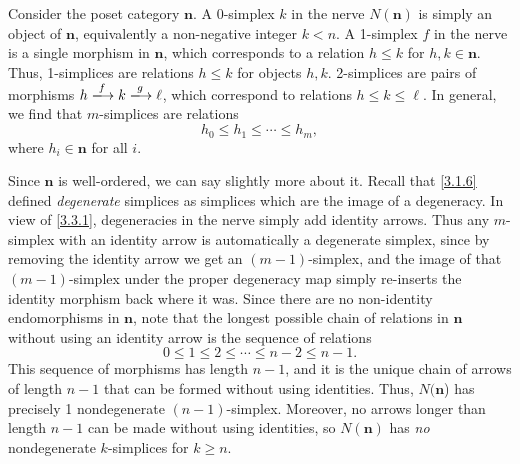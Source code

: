 \begin{example}\label{3.3.2}
    Consider the poset category $\mathbf{n}$. A 0-simplex $k$ in the nerve $N(\mathbf{n})$ is simply an object of $\mathbf{n}$, equivalently a non-negative integer $k<n$. A 1-simplex $f$ in the nerve is a single morphism in $\mathbf{n}$, which corresponds to a relation $h\leq k$ for $h,k\in\mathbf{n}$. Thus, 1-simplices are relations $h\leq k$ for objects $h,k$. 2-simplices are pairs of morphisms $h\xlongrightarrow{f}k\xlongrightarrow{g}\ell$, which correspond to relations $h\leq k\leq \ell$. In general, we find that $m$-simplices are relations
    \[
    h_0\leq h_1\leq\cdots\leq h_m,
    \]
    where $h_i\in\mathbf{n}$ for all $i$.

    Since $\mathbf{n}$ is well-ordered, we can say slightly more about it. Recall that \cref{3.1.6} defined \emph{degenerate} simplices as simplices which are the image of a degeneracy. In view of \cref{3.3.1}, degeneracies in the nerve simply add identity arrows. Thus any $m$-simplex with an identity arrow is automatically a degenerate simplex, since by removing the identity arrow we get an $(m-1)$-simplex, and the image of that $(m-1)$-simplex under the proper degeneracy map simply re-inserts the identity morphism back where it was. Since there are no non-identity endomorphisms in $\mathbf{n}$, note that the longest possible chain of relations in $\mathbf{n}$ without using an identity arrow is the sequence of relations
    \[
    0\leq 1\leq2\leq\cdots\leq n-2\leq n-1.
    \]
    This sequence of morphisms has length $n-1$, and it is the unique chain of arrows of length $n-1$ that can be formed without using identities. Thus, $N(\mathbf{n}$) has precisely 1 nondegenerate $(n-1)$-simplex. Moreover, no arrows longer than length $n-1$ can be made without using identities, so $N(\mathbf{n})$ has \emph{no} nondegenerate $k$-simplices for $k\geq n$.
\end{example}

